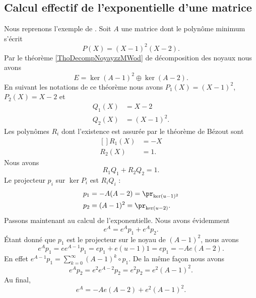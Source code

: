 \subsection{Calcul effectif de l'exponentielle d'une matrice}

Nous reprenons l'exemple de \cite{MneimneReduct}. Soit \( A\) une matrice dont le polynôme minimum s'écrit
\begin{equation}
    P(X)=(X-1)^2(X-2).
\end{equation}
Par le théorème \ref{ThoDecompNoyayzzMWod} de décomposition des noyaux nous avons
\begin{equation}
    E=\ker(A-1)^2\oplus\ker(A-2).
\end{equation}
En suivant les notations de ce théorème nous avons \( P_1(X)=(X-1)^2\), \( P_2(X)=X-2\) et
\begin{subequations}
    \begin{align}
        Q_1(X)&=X-2\\
        Q_2(X)&=(X-1)^2.
    \end{align}
\end{subequations}
Les polynômes \( R_i\) dont l'existence est assurée par le théorème de Bézout sont
\begin{equation}
    \begin{aligned}[]
        R_1(X)&=-X\\
        R_2(X)&=1.
    \end{aligned}
\end{equation}
Nous avons
\begin{equation}
    R_1Q_1+R_2Q_2=1.
\end{equation}
Le projecteur \( p_i\) sur \( \ker P_i\) est \( R_iQ_i\) :
\begin{equation}
    \begin{aligned}[]
        p_1&=-A(A-2)=\pr_{\ker(u-1)^2}\\
        p_2&=(A-1)^2=\pr_{\ker(u-2)}.
    \end{aligned}
\end{equation}
Passons maintenant au calcul de l'exponentielle. Nous avons évidemment
\begin{equation}
    e^A=e^Ap_1+e^Ap_2.
\end{equation}
Étant donné que \( p_1\) est le projecteur sur le noyau de \( (A-1)^2\), nous avons
\begin{equation}
    e^Ap_1=ee^{A-1}p_1=ep_1+e(u-1)1=ep_1=-Ae(A-2).
\end{equation}
En effet \( e^{A-1}p_1=\sum_{k=0}^{\infty}(A-1)^k\circ p_1\). De la même façon nous avons
\begin{equation}
    e^Ap_2=e^2e^{A-2}p_2=e^2p_2=e^2(A-1)^2.
\end{equation}
Au final,
\begin{equation}
    e^A=-Ae(A-2)+e^2(A-1)^2.
\end{equation}

